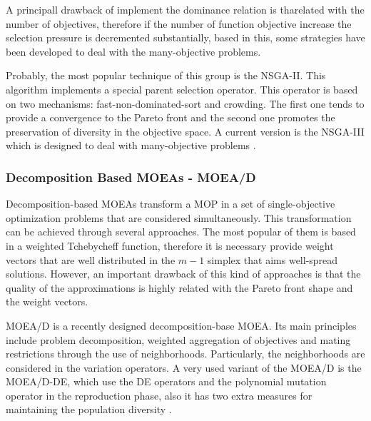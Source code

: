 A principall drawback of implement the dominance relation is tharelated with the number of objectives, therefore if the number of function objective increase the selection pressure is decremented substantially, based in this, some strategies have been developed to deal with the many-objective problems.

%
Probably, the most popular technique of this group is the NSGA-II.
%
This algorithm \cite{Joel:NSGAII} implements a special parent selection operator.
%
This operator is based on two mechanisms: fast-non-dominated-sort and crowding.
%
The first one tends to provide a convergence to the Pareto front and the second one promotes the preservation of diversity in the objective space.
%
A current version is the NSGA-III which is designed to deal with many-objective problems \cite{Joel:NSGAIII}.%
%

\subsubsection{Decomposition Based MOEAs - MOEA/D}

Decomposition-based MOEAs \cite{Joel:MOEAD} transform a MOP in a set of single-objective optimization problems that are considered simultaneously.
%
This transformation can be achieved through several approaches.
%
The most popular of them is based in a weighted Tchebycheff function, therefore it is necessary provide weight vectors that are well distributed in the $m-1$ simplex that aims well-spread solutions.
%
However, an important drawback of this kind of approaches is that the quality of the approximations is highly related with the Pareto front shape and the weight vectors.
%

MOEA/D \cite{Joel:MOEAD} is a recently designed decomposition-base MOEA.
%
Its main principles include problem decomposition, weighted aggregation of objectives and mating restrictions through the use of neighborhoods.
%
Particularly, the neighborhoods are considered in the variation operators.
%
A very used variant of the MOEA/D is the MOEA/D-DE, which use the DE operators \cite{price2006differential} and the polynomial mutation operator \cite{hamdan2012distribution} in the reproduction phase, also it has two extra measures for maintaining the population diversity \cite{zhang2009performance}.
%


